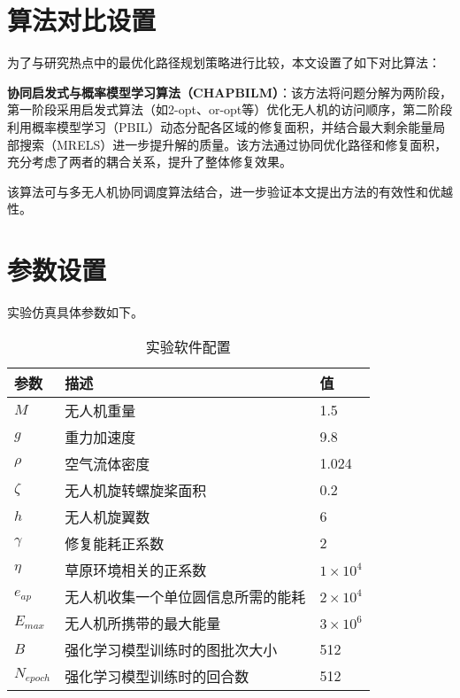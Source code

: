 \documentclass[AutoFakeBold]{LZUThesis}
\begin{document}
\section{算法对比设置}

为了与研究热点中的最优化路径规划策略\cite{aggarwal2020path}进行比较，本文设置了如下对比算法：

\textbf{协同启发式与概率模型学习算法（CHAPBILM）\cite{JIAO2024108084}}：该方法将问题分解为两阶段，第一阶段采用启发式算法（如2-opt、or-opt等）优化无人机的访问顺序，第二阶段利用概率模型学习（PBIL）动态分配各区域的修复面积，并结合最大剩余能量局部搜索（MRELS）进一步提升解的质量。该方法通过协同优化路径和修复面积，充分考虑了两者的耦合关系，提升了整体修复效果。

该算法可与多无人机协同调度算法结合，进一步验证本文提出方法的有效性和优越性。
\section{参数设置}
实验仿真具体参数如下。

\label{sub:无人机参数表格}
\begin{table}[H]
	\centering
	\caption{实验软件配置}
	\begin{tabular}{lll} %
		\toprule
		参数              & 描述                & 值                   \\
		\midrule
		\( M \)         & 无人机重量             & 1.5                 \\
		\( g \)         & 重力加速度             & 9.8                 \\
		\( \rho \)      & 空气流体密度            & 1.024               \\
		\( \zeta \)     & 无人机旋转螺旋桨面积        & 0.2                 \\
		\( h \)         & 无人机旋翼数            & 6                   \\
		\( \gamma \)    & 修复能耗正系数           & 2                   \\
		\( \eta \)      & 草原环境相关的正系数        & \( 1 \times 10^4 \) \\
		\( e_{ap} \)    & 无人机收集一个单位圆信息所需的能耗 & \( 2 \times 10^4 \) \\
		\( E_{max} \)   & 无人机所携带的最大能量       & \( 3 \times 10^6 \) \\
		\( B \)         & 强化学习模型训练时的图批次大小   & 512                 \\
		\( N_{epoch} \) & 强化学习模型训练时的回合数     & 512                 \\
		\bottomrule
	\end{tabular}
	\label{tbl_drone_parameters}
\end{table}
\end{document}
